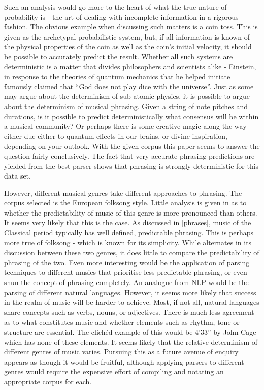 \documentclass[a4paper,12pt]{article}
\begin{document}
Such an analysis would go more to the heart of what the true nature of probability is - the art of dealing with incomplete information in a  rigorous fashion. The obvious example when discussing such matters is a coin toss. This is given as the archetypal probabilistic system, but, if all information is known of the physical properties of the coin as well as the coin's initial velocity, it should be possible to accurately predict the result. Whether all such systems are deterministic is a matter that divides philosophers and scientists alike - Einstein, in response to the theories of quantum mechanics that he helped initiate famously claimed that ``God does not play dice with the universe''. Just as some may argue about the determinism of sub-atomic physics, it is possible to argue about the determinism of musical phrasing. Given a string of note pitches and durations, is it possible to predict deterministically what consensus will be within a musical community? Or perhaps there is some creative magic along the way either due either to quantum effects in our brains, or divine inspiration, depending on your outlook. With the given corpus this paper seems to answer the question fairly conclusively. The fact that very accurate phrasing predictions are yielded from the best parser shows that phrasing is strongly deterministic for this data set.

However,  different musical genres take different approaches to phrasing. The corpus selected is the European folksong style. Little analysis is given in \cite{Bod_probabilisticgrammars} as to whether the predictability of music of this genre is more pronounced than others. It seems very likely that this is the case. As discussed in \ref{phrases}, music of the Classical period typically has well defined, predictable phrasing. This is perhaps more true of folksong - which is known for its simplicity. While \cite{Bod_probabilisticgrammars} alternates in its discussion between these two genres, it does little to compare the predictability of phrasing of the two. Even more interesting would be the application of parsing techniques to different musics that prioritise less predictable phrasing, or even shun the concept of phrasing completely. An analogue from NLP would be the parsing of different natural languages. However, it seems more likely that success in the realm of music will be harder to achieve. Most, if not all, natural languages share concepts such as verbs, nouns, or adjectives. There is much less agreement as to what constitutes music and whether elements such as rhythm, tone or structure are essential. The clich\'ed example of this would be 4'33'' by John Cage which has none of these elements. It seems likely that the relative determinism of different genres of music varies. Pursuing this as a future avenue of enquiry appears as though it would be fruitful, although applying parsers to different genres would require the expensive effort of compiling and notating an appropriate corpus for each.
\end{document}
